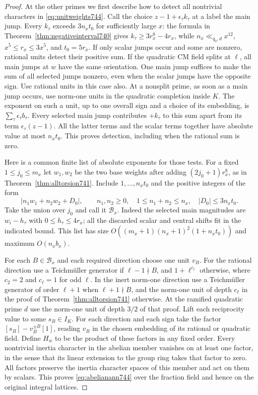 \documentclass[a4paper,11pt]{article}
\theoremstyle{definition}
\theoremstyle{remark}
\numberwithin{equation}{section}
\begin{document}
\begin{proof}
At the other primes we first describe how to detect all nontrivial
characters in \eqref{eq:unitweights744}. Call the choice
\(z-1+\epsilon_\tau k_\tau\) at a label the main jump. Every
\(k_\tau\) exceeds \(3n_xt_0\) for sufficiently large \(x\):
the formula in Theorem~\ref{thm:negativeinterval740} gives
\(k_\tau\ge3r_x^8-4r_x\), while \(n_x\ll_{q_0,d}x^{12}\),
\(x^5\le r_x\le3x^5\), and \(t_0=5r_x\). If only scalar
jumps occur and some are nonzero, rational units detect their
positive sum. If the quadratic CM field splits at \(\ell\),
all main jumps at \(w\) have the same orientation. One main
jump suffices to make the sum of all selected jumps nonzero,
even when the scalar jumps have the opposite sign. Use rational
units in this case also. At a nonsplit prime, as soon as a main
jump occurs, use norm-one units in the quadratic completion
inside \(K\). The exponent on such a unit, up to one overall
sign and a choice of its embedding, is \(\sum_\tau\epsilon_\tau
b_\tau\). Every selected main jump contributes \(+k_\tau\)
to this sum apart from its term \(\epsilon_\tau(z-1)\).
All the latter terms and the scalar terms together have absolute
value at most \(n_xt_0\). This proves detection, including when
the rational sum is zero.

Here is a common finite list of absolute exponents for those
tests. For a fixed \(1\le j_0\le m_x\) let \(w_1,w_2\) be
the two base weights after adding \((2j_0+1)r_x^8\), as in
Theorem~\ref{thm:alltorsion741}. Include \(1,\ldots,n_xt_0\)
and the positive integers of the form
\[
   |n_1 w_1+n_2 w_2+D_0|,\qquad
   n_1,n_2\ge0,\quad 1\le n_1+n_2\le n_x,\quad
   |D_0|\le 3n_xt_0 .
\]
Take the union over \(j_0\) and call it \(\mathcal B_x\).
Indeed the selected main magnitudes are \(w_i-h_\tau\) with
\(0\le h_\tau\le4r_x\); all the discarded scalar and central
shifts fit in the indicated bound. This list has size
\(O((m_x+1)(n_x+1)^2(1+n_xt_0))\) and maximum
\(O(n_xb_x)\).

For each \(B\in\mathcal B_x\) and each required direction
choose one unit \(v_B\). For the rational direction use a
Teichm\"uller generator if \(\ell-1\nmid B\), and
\(1+\ell^{c_\ell}\) otherwise, where \(c_2=2\) and
\(c_\ell=1\) for odd \(\ell\). In the inert norm-one direction
use a Teichm\"uller generator of order \(\ell+1\) when
\(\ell+1\nmid B\), and the norm-one unit of depth \(c_\ell\)
in the proof of Theorem~\ref{thm:alltorsion741} otherwise.
At the ramified quadratic prime \(d\) use the norm-one unit
of depth \(3/2\) of that proof. Lift each reciprocity value
to some \(s_B\in I_K\). For each direction and each sign take
the factor \([s_B]-v_B^{\pm B}[1]\), reading \(v_B\) in the
chosen embedding of its rational or quadratic field. Define
\(H_w\) to be the product of these factors in any fixed order.
Every nontrivial inertia character in the abelian member vanishes
on at least one factor, in the sense that its linear extension to
the group ring takes that factor to zero. All factors preserve
the inertia character spaces of this member and act on them by
scalars. This proves \eqref{eq:abelianann744} over the fraction
field and hence on the original integral lattices.


\end{proof}
\end{document}
